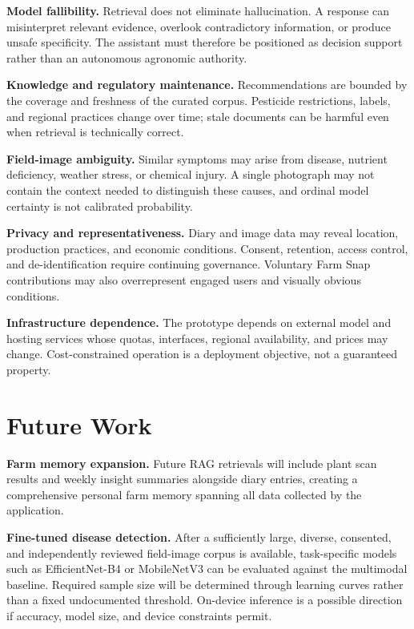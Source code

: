 \documentclass[conference]{IEEEtran}
\begin{document}
\textbf{Model fallibility.} Retrieval does not eliminate hallucination. A response can misinterpret relevant evidence, overlook contradictory information, or produce unsafe specificity. The assistant must therefore be positioned as decision support rather than an autonomous agronomic authority.

\textbf{Knowledge and regulatory maintenance.} Recommendations are bounded by the coverage and freshness of the curated corpus. Pesticide restrictions, labels, and regional practices change over time; stale documents can be harmful even when retrieval is technically correct.

\textbf{Field-image ambiguity.} Similar symptoms may arise from disease, nutrient deficiency, weather stress, or chemical injury. A single photograph may not contain the context needed to distinguish these causes, and ordinal model certainty is not calibrated probability.

\textbf{Privacy and representativeness.} Diary and image data may reveal location, production practices, and economic conditions. Consent, retention, access control, and de-identification require continuing governance. Voluntary Farm Snap contributions may also overrepresent engaged users and visually obvious conditions.

\textbf{Infrastructure dependence.} The prototype depends on external model and hosting services whose quotas, interfaces, regional availability, and prices may change. Cost-constrained operation is a deployment objective, not a guaranteed property.

\section{Future Work}

\textbf{Farm memory expansion.} Future RAG retrievals will include plant scan results and weekly insight summaries alongside diary entries, creating a comprehensive personal farm memory spanning all data collected by the application.

\textbf{Fine-tuned disease detection.} After a sufficiently large, diverse, consented, and independently reviewed field-image corpus is available, task-specific models such as EfficientNet-B4 or MobileNetV3 can be evaluated against the multimodal baseline. Required sample size will be determined through learning curves rather than a fixed undocumented threshold. On-device inference is a possible direction if accuracy, model size, and device constraints permit.
\end{document}
